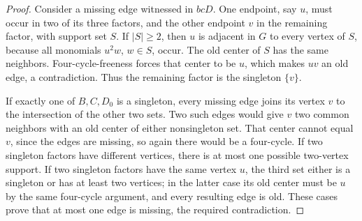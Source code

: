 \documentclass[11pt]{article}
\theoremstyle{definition}
\theoremstyle{remark}
\begin{document}
\begin{proof}
Consider a missing edge witnessed in $bcD$. One endpoint, say $u$, must occur in two of its three factors, and the other endpoint $v$ in the remaining factor, with support set $S$. If $|S|\ge2$, then $u$ is adjacent in $G$ to every vertex of $S$, because all monomials $u^2w$, $w\in S$, occur. The old center of $S$ has the same neighbors. Four-cycle-freeness forces that center to be $u$, which makes $uv$ an old edge, a contradiction. Thus the remaining factor is the singleton $\{v\}$.

If exactly one of $B,C,D_0$ is a singleton, every missing edge joins its vertex $v$ to the intersection of the other two sets. Two such edges would give $v$ two common neighbors with an old center of either nonsingleton set. That center cannot equal $v$, since the edges are missing, so again there would be a four-cycle. If two singleton factors have different vertices, there is at most one possible two-vertex support. If two singleton factors have the same vertex $u$, the third set either is a singleton or has at least two vertices; in the latter case its old center must be $u$ by the same four-cycle argument, and every resulting edge is old. These cases prove that at most one edge is missing, the required contradiction.
\end{proof}
\end{document}
